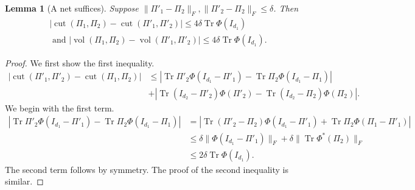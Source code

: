 \documentclass{article}
\newtheorem{lemma}[theorem]{Lemma}
\newcommand{\cut}{\operatorname{cut}}
\newcommand{\vol}{\operatorname{vol}}
\newcommand\tr{\operatorname{Tr}}
\begin{document}
\begin{lemma}[A net suffices]\label{lem:net-suffices}
Suppose $\|\Pi'_1 -\Pi_2\|_F, \|\Pi'_2 - \Pi_2\|_F \leq \delta$. Then 
\begin{align*} |\cut(\Pi_1, \Pi_2) - \cut(\Pi'_1, \Pi'_2)| \leq4\delta \tr \Phi(I_{d_1})\\
\textrm{ and }|\vol(\Pi_1, \Pi_2) - \vol(\Pi'_1, \Pi'_2)| \leq 4\delta \tr \Phi(I_{d_1}).
\end{align*}
\end{lemma}
\begin{proof}
We first show the first inequality.
\begin{align*}|\cut(\Pi'_1, \Pi'_2) - \cut(\Pi_1, \Pi_2)| & \leq |\tr \Pi'_2 \Phi(I_{d_1} - \Pi'_1) - \tr \Pi_2 \Phi(I_{d_1} - \Pi_1)|\\
&  + |\tr (I_{d_2} - \Pi'_2) \Phi(\Pi'_2) - \tr (I_{d_2} - \Pi_2) \Phi(\Pi_2)|.
\end{align*}
We begin with the first term. 
\begin{align*}|\tr \Pi'_2 \Phi(I_{d_1} - \Pi'_1) - \tr \Pi_2 \Phi(I_{d_1} - \Pi_1)| &= |\tr (\Pi'_2 - \Pi_2) \Phi(I_{d_1} - \Pi'_1) + \tr \Pi_2 \Phi(\Pi_1 - \Pi'_1)|\\
&\leq \delta\| \Phi(I_{d_1} - \Pi'_1)\|_F + \delta\| \tr \Phi^*(\Pi_2)\|_F\\
& \leq 2 \delta \tr \Phi(I_{d_1}).
\end{align*}
The second term follows by symmetry. The proof of the second inequality is similar.
\end{proof}
\end{document}

